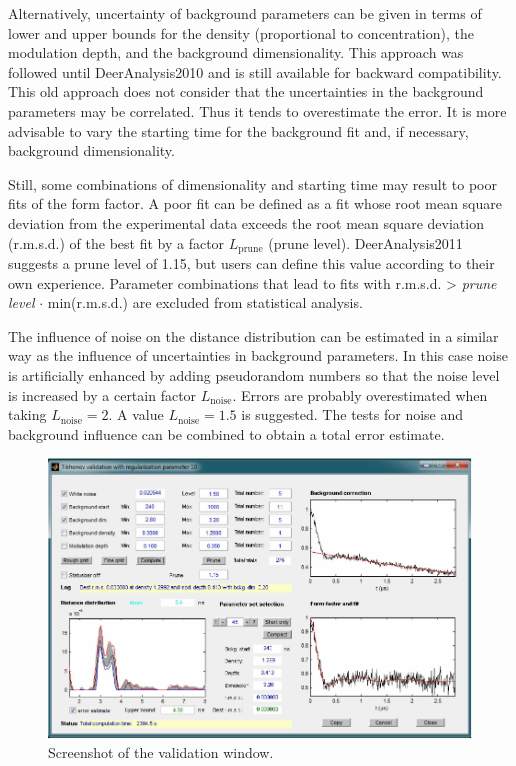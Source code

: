 \documentclass{article}
\begin{document}
Alternatively, uncertainty of background parameters can be given in terms of lower and upper bounds for the density (proportional to concentration), the modulation depth, and the background dimensionality. This approach was followed until DeerAnalysis2010 and is still available for backward compatibility. This old approach does not consider that the uncertainties in the background parameters may be correlated. Thus it tends to overestimate the error. It is more advisable to vary the starting time for the background fit and, if necessary, background dimensionality.

Still, some combinations of dimensionality and starting time may result to poor fits of the form factor. A poor fit can be defined as a fit whose root mean square deviation from the experimental data exceeds the root mean square deviation (r.m.s.d.) of the best fit by a factor $L_\mathrm{prune}$ (prune level). DeerAnalysis2011 suggests a prune level of 1.15, but users can define this value according to their own experience. Parameter combinations that lead to fits with r.m.s.d. > \emph{prune level} $\cdot$ min(r.m.s.d.) are excluded from statistical analysis. 

The influence of noise on the distance distribution can be estimated in a similar way as the influence of uncertainties in background parameters. In this case noise is artificially enhanced by adding pseudorandom numbers so that the noise level is increased by a certain factor $L_\mathrm{noise}$. Errors are probably overestimated when taking $L_\mathrm{noise}=2$. A value $L_\mathrm{noise}=1.5$ is suggested. The tests for noise and background influence can be combined to obtain a total error estimate.

\begin{figure}[ht]
 	\begin{center}
  \includegraphics[width=1.0\textwidth]{fig10.pdf}
	\end{center}
	\caption{Screenshot of the validation window.}
	\label{fig:validation}
\end{figure}
\end{document}
